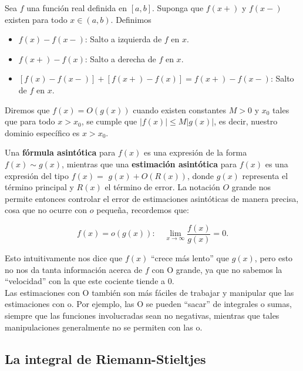 \begin{definition}
    Sea $f$ una función real definida en $[a,b]$. Suponga que $f(x+)$ y $f(x-)$ existen para todo $x \in (a,b)$. Definimos
       \begin{itemize}
           \item $f(x)-f(x-)$: Salto a izquierda de $f$ en $x$.
           \item $f(x+)-f(x)$: Salto a derecha de $f$ en $x$.
           \item $[f(x)-f(x-)]+[f(x+)-f(x)]=f(x+)-f(x-)$: Salto de $f$ en $x$.
       \end{itemize}
\end{definition}

\begin{note}
Diremos que $f(x)=O(g(x))$ cuando existen constantes $M>0$ y $x_0$ tales que para todo $x>x_0$, se cumple que $|f(x)| \leq M|g(x)|$, es decir, nuestro dominio específico es $x>x_0$.\\
\end{note}

Una \textbf{fórmula asintótica} para $f(x)$ es una expresión de la forma $f(x) \sim g(x)$, mientras que una \textbf{estimación asintótica} para $f(x)$ es una expresión del tipo $f(x)=$ $g(x)+O(R(x))$, donde $g(x)$ representa el término principal y $R(x)$ el término de error. La notación $O$ grande nos permite entonces controlar el error de estimaciones asintóticas de manera precisa, cosa que no ocurre con $o$ pequeña, recordemos que:

$$f(x)=o(g(x)): \quad \displaystyle \lim_{x \to \infty} \frac{f(x)}{g(x)}=0.$$

Esto intuitivamente nos dice que $f(x)$ ``crece más lento'' que $g(x)$, pero esto no nos da tanta información acerca de $f$ con O grande, ya que no sabemos la ``velocidad'' con la que este cociente tiende a 0.\\

Las estimaciones con O también son más fáciles de trabajar y manipular que las estimaciones con o. Por ejemplo, las O se pueden ``sacar'' de integrales o sumas, siempre que las funciones involucradas sean no negativas, mientras que tales manipulaciones generalmente no se permiten con las o.\\

\subsection{La integral de Riemann-Stieltjes}


